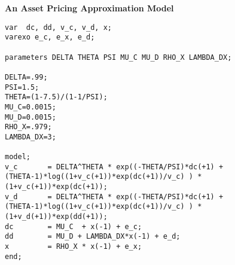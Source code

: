 \documentclass[12pt]{article}
\begin{document}



	












\newpage

\centerline{\bf \large An Asset Pricing Approximation Model}

\begin{verbatim}
var  dc, dd, v_c, v_d, x;
varexo e_c, e_x, e_d;

parameters DELTA THETA PSI MU_C MU_D RHO_X LAMBDA_DX;

DELTA=.99;
PSI=1.5;
THETA=(1-7.5)/(1-1/PSI); 
MU_C=0.0015;
MU_D=0.0015;
RHO_X=.979;
LAMBDA_DX=3;

model;
v_c       = DELTA^THETA * exp((-THETA/PSI)*dc(+1) + 
(THETA-1)*log((1+v_c(+1))*exp(dc(+1))/v_c) ) * (1+v_c(+1))*exp(dc(+1));
v_d       = DELTA^THETA * exp((-THETA/PSI)*dc(+1) + 
(THETA-1)*log((1+v_c(+1))*exp(dc(+1))/v_c) ) * (1+v_d(+1))*exp(dd(+1));
dc        = MU_C  + x(-1) + e_c;
dd        = MU_D + LAMBDA_DX*x(-1) + e_d;
x         = RHO_X * x(-1) + e_x;
end;

\end{verbatim}


\end{document}

